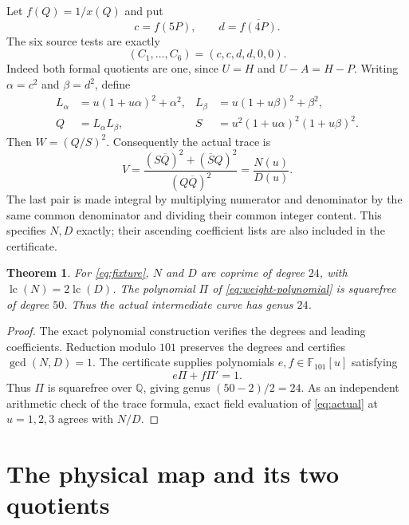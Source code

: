 \documentclass[11pt,a4paper]{article}
\newtheorem{theorem}{Theorem}[section]
\newcommand{\Q}{\mathbb Q}
\begin{document}
Let $f(Q)=1/x(Q)$ and put
\[
 c=f(5P),\qquad d=\overline{f(4P)}.
\]
The six source tests are exactly
\[
                    (C_1,\ldots,C_6)=(c,c,d,d,0,0).
\]
Indeed both formal quotients are one, since $U=H$ and $U-A=H-P$.
Writing $\alpha=c^2$ and $\beta=d^2$, define
\[
 \begin{aligned}
 L_\alpha&=u(1+u\alpha)^2+\alpha^2,
       &L_\beta&=u(1+u\beta)^2+\beta^2,\\
 Q&=L_\alpha L_\beta,
       &S&=u^2(1+u\alpha)^2(1+u\beta)^2.
 \end{aligned}
\]
Then $W=(Q/S)^2$. Consequently the actual trace is
\begin{equation}\label{eq:trace-fixture}
 V=\frac{(S\overline Q)^2+(\overline S Q)^2}
          {(Q\overline Q)^2}=\frac{N(u)}{D(u)}.
\end{equation}
The last pair is made integral by multiplying numerator and denominator
by the same common denominator and dividing their common integer
content. This specifies $N,D$ exactly; their ascending coefficient
lists are also included in the certificate.

\begin{theorem}\label{thm:fixture}
For \eqref{eq:fixture}, $N$ and $D$ are coprime of degree $24$,
with $\operatorname{lc}(N)=2\operatorname{lc}(D)$. The polynomial
$\Pi$ of \eqref{eq:weight-polynomial} is squarefree of degree $50$.
Thus the actual intermediate curve has genus $24$.
\end{theorem}
\begin{proof}
The exact polynomial construction verifies the degrees and leading
coefficients. Reduction modulo $101$ preserves the degrees and
certifies $\gcd(N,D)=1$. The certificate supplies polynomials
$e,f\in\mathbb F_{101}[u]$ satisfying
\[
                     e\Pi+f\Pi'=1.
\]
Thus $\Pi$ is squarefree over $\Q$, giving genus $(50-2)/2=24$.
As an independent arithmetic check of the trace formula, exact field
evaluation of \eqref{eq:actual} at $u=1,2,3$ agrees with $N/D$.
\end{proof}

\section{The physical map and its two quotients}
\end{document}
